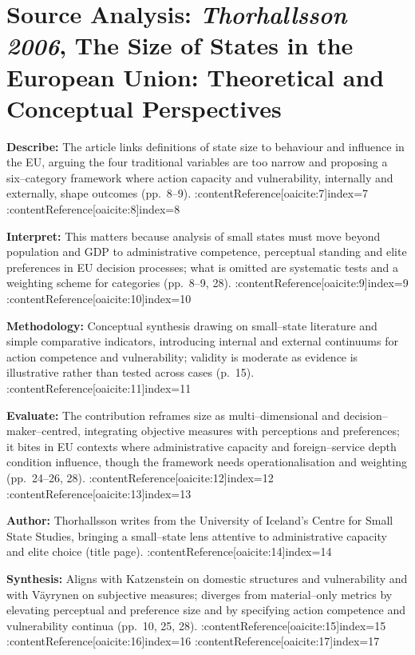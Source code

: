 \section*{Source Analysis: \textit{Thorhallsson 2006}, The Size of States in the European Union: Theoretical and Conceptual Perspectives}

\textbf{Describe:} The article links definitions of state size to behaviour and influence in the EU, arguing the four traditional variables are too narrow and proposing a six–category framework where action capacity and vulnerability, internally and externally, shape outcomes (pp.~8--9). :contentReference[oaicite:7]{index=7} :contentReference[oaicite:8]{index=8}

\textbf{Interpret:} This matters because analysis of small states must move beyond population and GDP to administrative competence, perceptual standing and elite preferences in EU decision processes; what is omitted are systematic tests and a weighting scheme for categories (pp.~8--9, 28). :contentReference[oaicite:9]{index=9} :contentReference[oaicite:10]{index=10}

\textbf{Methodology:} Conceptual synthesis drawing on small–state literature and simple comparative indicators, introducing internal and external continuums for action competence and vulnerability; validity is moderate as evidence is illustrative rather than tested across cases (p.~15). :contentReference[oaicite:11]{index=11}

\textbf{Evaluate:} The contribution reframes size as multi–dimensional and decision–maker–centred, integrating objective measures with perceptions and preferences; it bites in EU contexts where administrative capacity and foreign–service depth condition influence, though the framework needs operationalisation and weighting (pp.~24--26, 28). :contentReference[oaicite:12]{index=12} :contentReference[oaicite:13]{index=13}

\textbf{Author:} Thorhallsson writes from the University of Iceland’s Centre for Small State Studies, bringing a small–state lens attentive to administrative capacity and elite choice (title page). :contentReference[oaicite:14]{index=14}

\textbf{Synthesis:} Aligns with Katzenstein on domestic structures and vulnerability and with Väyrynen on subjective measures; diverges from material–only metrics by elevating perceptual and preference size and by specifying action competence and vulnerability continua (pp.~10, 25, 28). :contentReference[oaicite:15]{index=15} :contentReference[oaicite:16]{index=16} :contentReference[oaicite:17]{index=17}


